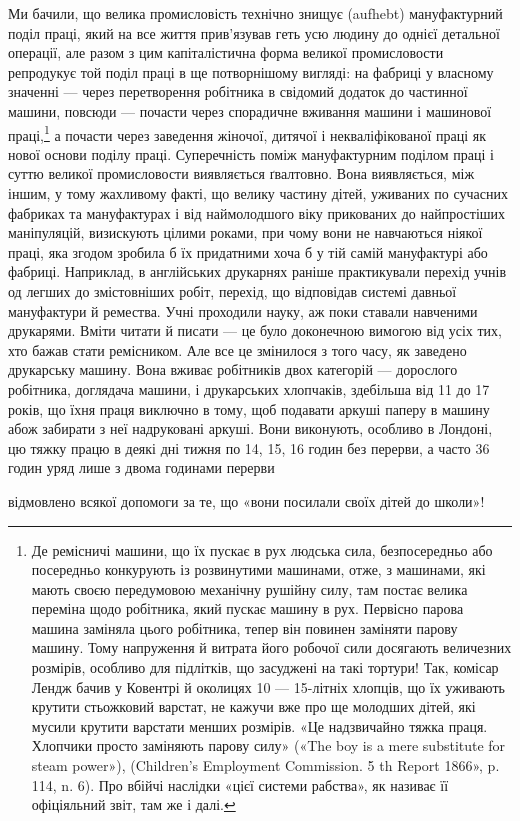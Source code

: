 Ми бачили, що велика промисловість технічно знищує (aufhebt)
мануфактурний поділ праці, який на все життя прив’язував
геть усю людину до однієї детальної операції, але разом з цим
капіталістична форма великої промисловости репродукує той
поділ праці в ще потворнішому вигляді: на фабриці у власному
значенні — через перетворення робітника в свідомий додаток
до частинної машини, повсюди — почасти через спорадичне вживання
машини і машинової праці,\footnote{
Де ремісничі машини, що їх пускає в рух людська сила, безпосередньо
або посередньо конкурують із розвинутими машинами, отже, з
машинами, які мають своєю передумовою механічну рушійну силу, там
постає велика переміна щодо робітника, який пускає машину в рух.
Первісно парова машина заміняла цього робітника, тепер він повинен
заміняти парову машину. Тому напруження й витрата його робочої сили
досягають величезних розмірів, особливо для підлітків, що засуджені
на такі тортури! Так, комісар Лендж бачив у Ковентрі й околицях 10 —
15-літніх хлопців, що їх уживають крутити стьожковий варстат, не
кажучи вже про ще молодших дітей, які мусили крутити варстати менших
розмірів. «Це надзвичайно тяжка праця. Хлопчики просто заміняють
парову силу» («The boy is a mere substitute for steam power»),
(Children’s Employment Commission. 5 th Report 1866», p. 114, n. 6). Про
вбійчі наслідки «цієї системи рабства», як називає її офіціяльний звіт,
там же і далі.
} а почасти через заведення
жіночої, дитячої і некваліфікованої праці як нової основи поділу
праці. Суперечність поміж мануфактурним поділом праці і суттю
великої промисловости виявляється ґвалтовно. Вона виявляється,
між іншим, у тому жахливому факті, що велику частину дітей,
уживаних по сучасних фабриках та мануфактурах і від наймолодшого
віку прикованих до найпростіших маніпуляцій, визискують
цілими роками, при чому вони не навчаються ніякої праці, яка
згодом зробила б їх придатними хоча б у тій самій мануфактурі
або фабриці. Наприклад, в англійських друкарнях раніше практикували
перехід учнів од легших до змістовніших робіт, перехід,
що відповідав системі давньої мануфактури й ремества. Учні
проходили науку, аж поки ставали навченими друкарями. Вміти
читати й писати — це було доконечною вимогою від усіх тих,
хто бажав стати ремісником. Але все це змінилося з того часу,
як заведено друкарську машину. Вона вживає робітників двох
категорій — дорослого робітника, доглядача машини, і друкарських
хлопчаків, здебільша від 11 до 17 років, що їхня праця
виключно в тому, щоб подавати аркуші паперу в машину абож
забирати з неї надруковані аркуші. Вони виконують, особливо
в Лондоні, цю тяжку працю в деякі дні тижня по 14, 15, 16 годин
без перерви, а часто 36 годин уряд лише з двома годинами перерви

відмовлено всякої допомоги за те, що «вони посилали своїх дітей до
школи»!
\parbreak{}  %
